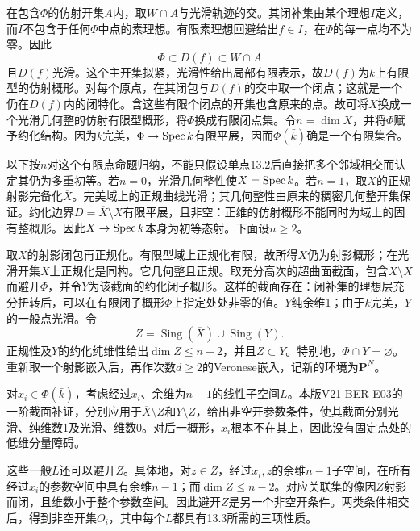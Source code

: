 \begin{analysisproof}
在包含$\Phi$的仿射开集$A$内，取$W\cap A$与光滑轨迹的交。其闭补集由某个理想$I$定义，而$I$不包含于任何$\Phi$中点的素理想。有限素理想回避给出$f\in I$，在$\Phi$的每一点均不为零。因此
\[
\Phi\subset D(f)\subset W\cap A
\]
且$D(f)$光滑。这个主开集拟紧，光滑性给出局部有限表示，故$D(f)$为$k$上有限型的仿射概形。对每个原点，在其闭包与$D(f)$的交中取一个闭点；这就是一个仍在$D(f)$内的闭特化。含这些有限个闭点的开集也含原来的点。故可将$X$换成一个光滑几何整的仿射有限型概形，将$\Phi$换成有限闭点集。令$n=\dim X$，并将$\Phi$赋予约化结构。因为$k$完美，$\Phi\to\operatorname{Spec} k$有限平展，因而$\Phi(\bar k)$确是一个有限集合。

以下按$n$对这个有限点命题归纳，不能只假设单点13.2后直接把多个邻域相交而认定其仍为多重初等。若$n=0$，光滑几何整性使$X=\operatorname{Spec} k$。若$n=1$，取$X$的正规射影完备化$\overline X$。完美域上的正规曲线光滑；其几何整性由原来的稠密几何整开集保证。约化边界$D=\overline X\setminus X$有限平展，且非空：正维的仿射概形不能同时为域上的固有整概形。因此$X\to\operatorname{Spec} k$本身为初等态射。下面设$n\geq2$。

取$X$的射影闭包再正规化。有限型域上正规化有限，故所得$\overline X$仍为射影概形；在光滑开集$X$上正规化是同构。它几何整且正规。取充分高次的超曲面截面，包含$\overline X\setminus X$而避开$\Phi$，并令$Y$为该截面的约化闭子概形。这样的截面存在：闭补集的理想层充分扭转后，可以在有限闭子概形$\Phi$上指定处处非零的值。$Y$纯余维1；由于$k$完美，$Y$的一般点光滑。令
\[
Z=\operatorname{Sing}(\overline X)\cup\operatorname{Sing}(Y).
\]
正规性及$Y$的约化纯维性给出$\dim Z\leq n-2$，并且$Z\subset Y$。特别地，$\Phi\cap Y=\varnothing$。重新取一个射影嵌入后，再作次数$d\geq2$的Veronese嵌入，记新的环境为$\mathbf P^N$。

对$x_i\in\Phi(\bar k)$，考虑经过$x_i$、余维为$n-1$的线性子空间$L$。本版V21-BER-E03的一阶截面补证，分别应用于$\overline X\setminus Z$和$Y\setminus Z$，给出非空开参数条件，使其截面分别光滑、纯维数1及光滑、维数0。对后一概形，$x_i$根本不在其上，因此没有固定点处的低维分量障碍。

这些一般$L$还可以避开$Z$。具体地，对$z\in Z$，经过$x_i,z$的余维$n-1$子空间，在所有经过$x_i$的参数空间中具有余维$n-1$；而$\dim Z\leq n-2$。对应关联集的像因$Z$射影而闭，且维数小于整个参数空间。因此避开$Z$是另一个非空开条件。两类条件相交后，得到非空开集$O_i$，其中每个$L$都具有13.3所需的三项性质。


\end{analysisproof}
